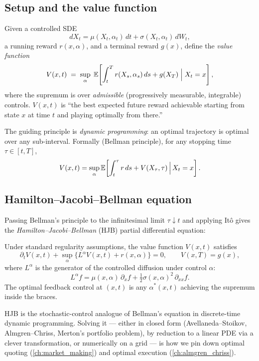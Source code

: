 \subsection{Setup and the value function}

Given a controlled SDE
\[
dX_t = \mu(X_t, \alpha_t)\,dt + \sigma(X_t, \alpha_t)\,dW_t,
\]
a running reward $r(x, \alpha)$, and a terminal reward $g(x)$, define
the \emph{value function}
\[
V(x, t) \;=\; \sup_{\alpha} \;
  \mathbb{E}\!\left[\int_t^T r(X_s, \alpha_s)\,ds + g(X_T) \;\Big|\; X_t = x\right],
\]
where the supremum is over \emph{admissible} (progressively measurable,
integrable) controls. $V(x, t)$ is ``the best expected future reward
achievable starting from state $x$ at time $t$ and playing optimally
from there.''

The guiding principle is \emph{dynamic programming}: an optimal
trajectory is optimal over any sub-interval. Formally (Bellman principle),
for any stopping time $\tau \in [t, T]$,
\[
V(x,t) = \sup_\alpha \mathbb{E}\!\left[
  \int_t^\tau r\,ds + V(X_\tau, \tau) \,\Big|\, X_t = x
\right].
\]

\subsection{Hamilton--Jacobi--Bellman equation}

Passing Bellman's principle to the infinitesimal limit $\tau \downarrow t$
and applying It\^o gives the \emph{Hamilton--Jacobi--Bellman} (HJB)
partial differential equation:

\begin{keyfactbox}
Under standard regularity assumptions, the value function $V(x,t)$
satisfies
\[
\partial_t V(x,t) + \sup_{\alpha}
  \Big\{ L^\alpha V(x,t) + r(x,\alpha) \Big\} = 0,
\qquad V(x,T) = g(x),
\]
where $L^\alpha$ is the generator of the controlled diffusion under
control $\alpha$:
\[
L^\alpha f = \mu(x,\alpha)\,\partial_x f + \tfrac{1}{2}\sigma(x,\alpha)^2\,\partial_{xx}f.
\]
The optimal feedback control at $(x,t)$ is any $\alpha^*(x,t)$ achieving
the supremum inside the braces.
\end{keyfactbox}

HJB is the stochastic-control analogue of Bellman's equation in
discrete-time dynamic programming. Solving it --- either in closed form
(Avellaneda--Stoikov, Almgren--Chriss, Merton's portfolio problem), by
reduction to a linear PDE via a clever transformation, or numerically on
a grid --- is how we pin down optimal quoting (\cref{ch:market_making})
and optimal execution (\cref{ch:almgren_chriss}).

